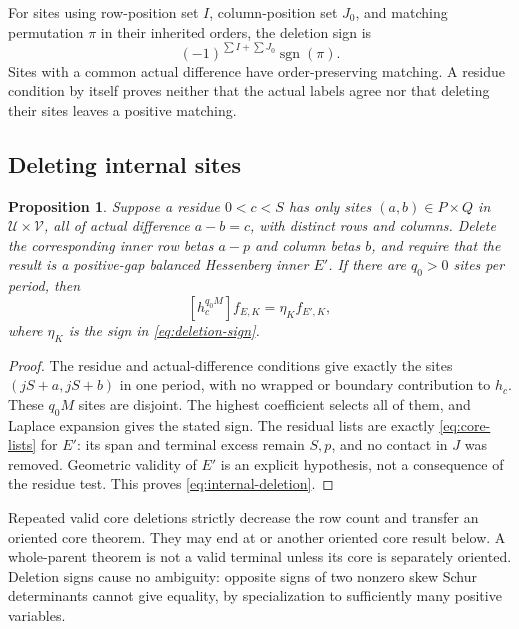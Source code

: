 \documentclass[11pt,a4paper]{amsart}
\numberwithin{equation}{section}
\theoremstyle{plain}
\newtheorem{proposition}[theorem]{Proposition}
\theoremstyle{definition}
\begin{document}
For sites using row-position set \(I\), column-position set \(J_0\), and matching permutation \(\pi\) in their inherited orders, the deletion sign is
\begin{equation}\label{eq:deletion-sign}
 (-1)^{\sum I+\sum J_0}\operatorname{sgn}(\pi).
\end{equation}
Sites with a common actual difference have order-preserving matching.  A residue condition by itself proves neither that the actual labels agree nor that deleting their sites leaves a positive matching.

\subsection{Deleting internal sites}

\begin{proposition}\label{prop:internal-deletion}
Suppose a residue \(0<c<S\) has only sites \((a,b)\in P\times Q\) in \(\mathcal U\times\mathcal V\), all of actual difference \(a-b=c\), with distinct rows and columns.  Delete the corresponding inner row betas \(a-p\) and column betas \(b\), and require that the result is a positive-gap balanced Hessenberg inner \(E'\).  If there are \(q_0>0\) sites per period, then
\begin{equation}\label{eq:internal-deletion}
 [h_c^{q_0M}]f_{E,K}=\eta_K f_{E',K},
\end{equation}
where \(\eta_K\) is the sign in \eqref{eq:deletion-sign}.
\end{proposition}
\begin{proof}
The residue and actual-difference conditions give exactly the sites \((jS+a,jS+b)\) in one period, with no wrapped or boundary contribution to \(h_c\).  These \(q_0M\) sites are disjoint.  The highest coefficient selects all of them, and Laplace expansion gives the stated sign.  The residual lists are exactly \eqref{eq:core-lists} for \(E'\): its span and terminal excess remain \(S,p\), and no contact in \(J\) was removed.  Geometric validity of \(E'\) is an explicit hypothesis, not a consequence of the residue test.  This proves \eqref{eq:internal-deletion}.
\end{proof}

Repeated valid core deletions strictly decrease the row count and transfer an oriented core theorem.  They may end at  or another oriented core result below.  A whole-parent theorem is not a valid terminal unless its core is separately oriented.  Deletion signs cause no ambiguity: opposite signs of two nonzero skew Schur determinants cannot give equality, by specialization to sufficiently many positive variables.
\end{document}

